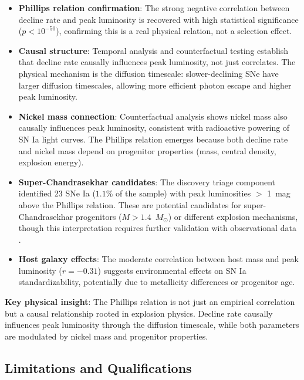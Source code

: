 \documentclass[usenatbib]{rasti}
\begin{document}
\begin{itemize}
\item \textbf{Phillips relation confirmation}: The strong negative correlation between decline rate and peak luminosity is recovered with high statistical significance ($p < 10^{-50}$), confirming this is a real physical relation, not a selection effect.

\item \textbf{Causal structure}: Temporal analysis and counterfactual testing establish that decline rate causally influences peak luminosity, not just correlates. The physical mechanism is the diffusion timescale: slower-declining SNe have larger diffusion timescales, allowing more efficient photon escape and higher peak luminosity.

\item \textbf{Nickel mass connection}: Counterfactual analysis shows nickel mass also causally influences peak luminosity, consistent with radioactive powering of SN Ia light curves. The Phillips relation emerges because both decline rate and nickel mass depend on progenitor properties (mass, central density, explosion energy).

\item \textbf{Super-Chandrasekhar candidates}: The discovery triage component identified 23 SNe Ia ($1.1$\% of the sample) with peak luminosities $>$ 1~mag above the Phillips relation. These are potential candidates for super-Chandrasekhar progenitors ($M > 1.4$~$M_{\odot}$) or different explosion mechanisms, though this interpretation requires further validation with observational data \cite{howell2011,taubenberger2017}.

\item \textbf{Host galaxy effects}: The moderate correlation between host mass and peak luminosity ($r = -0.31$) suggests environmental effects on SN Ia standardizability, potentially due to metallicity differences or progenitor age.
\end{itemize}

\textbf{Key physical insight}: The Phillips relation is not just an empirical correlation but a causal relationship rooted in explosion physics. Decline rate causally influences peak luminosity through the diffusion timescale, while both parameters are modulated by nickel mass and progenitor properties.

\subsection{Limitations and Qualifications}
\end{document}
